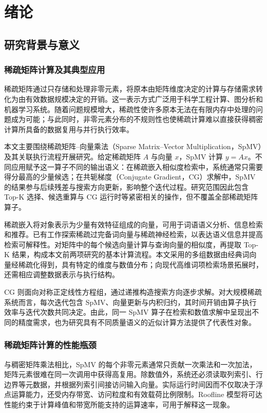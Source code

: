 \chapter{绪论}\label{chap:intro}
\section{研究背景与意义}
\subsection{稀疏矩阵计算及其典型应用}
稀疏矩阵通过只存储和处理非零元素，将原本由矩阵维度决定的计算与存储需求转化为由有效数据规模决定的开销。这一表示方式广泛用于科学工程计算、图分析和机器学习系统。随着问题规模增大，稀疏性使许多原本无法在有限内存中处理的问题成为可能；与此同时，非零元素分布的不规则性也使稀疏计算难以直接获得稠密计算所具备的数据复用与并行执行效率\cite{gao2024systematic}。

本文主要围绕稀疏矩阵--向量乘法（Sparse Matrix--Vector Multiplication，SpMV）及其关联执行流程开展研究。给定稀疏矩阵 $A$ 与向量 $x$，SpMV 计算 $y=Ax$。不同应用赋予这一算子不同的输出语义：在稀疏嵌入相似度检索中，系统通常只需要得分最高的少量候选；在共轭梯度（Conjugate Gradient，CG）求解中，SpMV 的结果参与后续残差与搜索方向更新，影响整个迭代过程。研究范围因此包含 Top-K 选择、候选重算与 CG 运行时等紧密相关的操作，但不覆盖全部稀疏矩阵算子。

稀疏嵌入将对象表示为少量有效特征组成的向量，可用于词语语义分析、信息检索和推荐。已有工作探索稀疏过完备词向量与稀疏神经检索，以表达语义信息并提高检索可解释性\cite{sparse_2015,spine_2018,formal2021splade}。对矩阵中的每个候选向量计算与查询向量的相似度，再提取 Top-K 结果，构成本文前两项研究的基本计算流程。本文采用的多组数据由经典词向量经稀疏化得到，具有特定的维度与数值分布；向现代高维词项检索场景拓展时，还需相应调整数据表示与执行结构。

CG 则面向对称正定线性方程组，通过递推构造搜索方向逐步求解\cite{hestenes1952,saad2003}。对大规模稀疏系统而言，每次迭代包含 SpMV、向量更新与内积归约，其时间开销由算子执行效率与迭代次数共同决定。由此，同一 SpMV 算子在检索和数值求解中呈现出不同的精度需求，也为研究具有不同质量语义的近似计算方法提供了代表性对象。

\subsection{稀疏矩阵计算的性能瓶颈}
与稠密矩阵乘法相比，SpMV 的每个非零元素通常只贡献一次乘法和一次加法，矩阵元素很难在同一次调用中获得高复用。除数值外，系统还必须读取列索引、行边界等元数据，并根据列索引间接访问输入向量。实际运行时间因而不仅取决于浮点运算能力，还受内存带宽、访问粒度和有效载荷比例限制。Roofline 模型将可达性能约束于计算峰值和带宽所能支持的运算速率，可用于解释这一现象\cite{williams2009roofline}。


